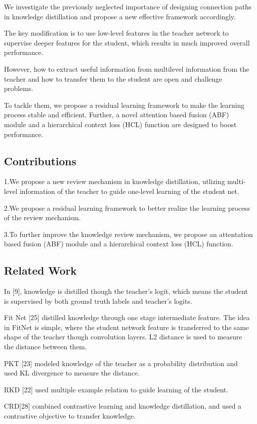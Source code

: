 \documentclass[11pt]{article}
\begin{document}
We investigate the previously neglected importance of designing connection paths in knowledge distillation and propose a new effective framework accordingly.

The key modification is to use low-level features in the teacher network to supervise deeper features for the student, which results in much improved overall performance.

However, how to extract useful information from multilevel information from the teacher and how to transfer them to the student are open and challenge problems.

To tackle them, we propose a residual learning framework to make the learning process stable and efficient. Further, a novel attention based fusion (ABF) module and a hierarchical context loss (HCL) function are designed to boost performance.

\subsection{Contributions}
1.We propose a new review mechanism in knowledge distillation, utlizing multi-level information of the teacher to guide one-level learning of the student net.

2.We propose a residual learning framework to better realize the learning process of the review mechanism.

3.To further improve the knowledge review mechanism, we propose an attentation based fusion (ABF) module and a hierarchical context loss (HCL) function.

\subsection{Related Work}
In [9], knowledge is distilled though the teacher’s logit, which means the student is supervised by both ground truth labels and teacher’s logits.

Fit Net [25] distilled knowledge through one stage intermediate feature. The idea in FitNet is simple, where the student network feature is transferred to the same shape of the teacher though convolution layers. L2 distance is used to measure the distance between them.

PKT [23] modeled knowledge of the teacher as a probability distribution and used KL divergence to measure the distance.

RKD [22] used multiple example relation to guide learning of the student.

CRD[28] combined contrastive learning and knowledge distillation, and used a contrastive objective to transfer knowledge.
\end{document}
